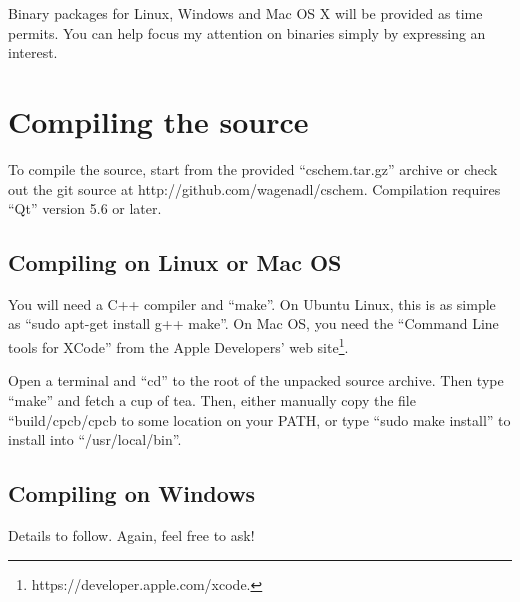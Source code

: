 \documentclass[11pt]{report}
\begin{document}
Binary packages for Linux, Windows and Mac OS X will be provided as time
permits. You can help focus my attention on binaries simply by
expressing an interest.



\section{Compiling the source}
To compile the source,  start from the provided
``cschem.tar.gz'' archive or check out the git source at
http://github.com/wagenadl/cschem. Compilation requires
``Qt'' version 5.6 or later.

\subsection{Compiling on Linux or Mac OS}

You will need a C++ compiler and ``make''. On Ubuntu Linux, this is as simple
as ``sudo apt-get install g++ make''. On Mac OS, you need the
``Command Line tools for XCode'' from the Apple Developers' web
site\footnote{https://developer.apple.com/xcode.}.

Open a terminal and ``cd'' to the root of the unpacked source
archive. Then type ``make'' and fetch a cup of tea. Then, either
manually copy the file ``build/cpcb/cpcb to some location on your PATH, or type ``sudo make
install'' to install into ``/usr/local/bin''.

\subsection{Compiling on Windows}

Details to follow. Again, feel free to ask!
% 
\end{document}
